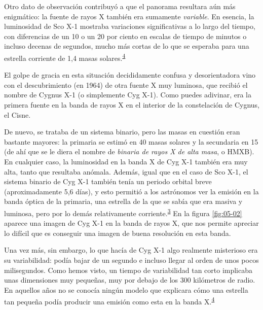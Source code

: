 Otro dato de observación contribuyó a que el panorama resultara aún más enigmático: la fuente de rayos X también era sumamente \emph{variable}. En esencia, la luminosidad de Sco X-1 mostraba variaciones significativas a lo largo del tiempo, con diferencias de un 10 o un 20 por ciento en escalas de tiempo de minutos o incluso decenas de segundos, mucho más cortas de lo que se esperaba para una estrella corriente de 1,4 masas solares.\textsuperscript{\hyperlink{note:05-04}{4}}

El golpe de gracia en esta situación decididamente confusa y desorientadora vino con el descubrimiento (en 1964) de otra fuente X muy luminosa, que recibió el nombre de Cygnus X-1 (o simplemente Cyg X-1). Como puedes adivinar, era la primera fuente en la banda de rayos X en el interior de la constelación de Cygnus, el Cisne.

De nuevo, se trataba de un sistema binario, pero las masas en cuestión eran bastante mayores: la primaria se estimó en 40 masas solares y la secundaria en 15 (de ahí que se le diera el nombre de \emph{binaria de rayos X de alta masa}, o HMXB). En cualquier caso, la luminosidad en la banda X de Cyg X-1 también era muy alta, tanto que resultaba anómala. Además, igual que en el caso de Sco X-1, el sistema binario de Cyg X-1 también tenía un periodo orbital breve (aproximadamente 5,6 días), y esto permitió a los astrónomos ver la emisión en la banda óptica de la primaria, una estrella de la que se sabía que era masiva y luminosa, pero por lo demás relativamente corriente.\textsuperscript{\hyperlink{note:05-03}{3}} En la figura \ref{fig:05-02} aparece una imagen de Cyg X-1 en la banda de rayos X, que nos permite apreciar lo difícil que es conseguir una imagen de buena resolución en esta banda.

Una vez más, sin embargo, lo que hacía de Cyg X-1 algo realmente misterioso era su variabilidad: podía bajar de un segundo e incluso llegar al orden de unos pocos milisegundos. Como hemos visto, un tiempo de variabilidad tan corto implicaba unas dimensiones muy pequeñas, muy por debajo de los 300 kilómetros de radio. En aquellos años no se conocía ningún modelo que explicara cómo una estrella tan pequeña podía producir una emisión como esta en la banda X.\textsuperscript{\hyperlink{note:05-04}{4}}

